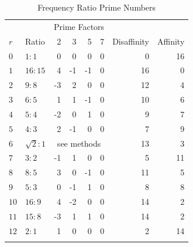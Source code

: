 \documentclass[sn-mathphys]{sn-jnl}%
\begin{document}
\begin{table}[h]
  \begin{center}
    \begin{minipage}{174pt}
      \caption{Frequency Ratio Prime Numbers}\label{tab1}%
      \begin{tabular}{@{}llrrrrrr@{}}
        \toprule
             &              & \multicolumn{4}{c}{Prime Factors} & & \\
        $r$  & Ratio        &  2 &  3 &  5 &  7 & Disaffinity & Affinity \\
        \midrule
        $0$  & $1:1$        &  0 &  0 &  0 &  0 & 0           & 16 \\
        $1$  & $16:15$      &  4 & -1 & -1 &  0 & 16          &  0 \\
        $2$  & $9:8$        & -3 &  2 &  0 &  0 & 12          &  4 \\
        $3$  & $6:5$        &  1 &  1 & -1 &  0 & 10          &  6 \\
        $4$  & $5:4$        & -2 &  0 &  1 &  0 &  9          &  7 \\
        $5$  & $4:3$        &  2 & -1 &  0 &  0 &  7          &  9 \\
        $6$  & $\sqrt{2}:1$ & \multicolumn{4}{c}{see methods}   & 13          &  3 \\
        $7$  & $3:2$        & -1 &  1 &  0 &  0 &  5          & 11 \\
        $8$  & $8:5$        &  3 &  0 & -1 &  0 & 11          &  5 \\
        $9$  & $5:3$        &  0 & -1 &  1 &  0 &  8          &  8 \\
        $10$ & $16:9$       &  4 & -2 &  0 &  0 & 14          &  2 \\
        $11$ & $15:8$       & -3 &  1 &  1 &  0 & 14          &  2 \\
        $12$ & $2:1$        &  1 &  0 &  0 &  0 &  2          & 14 \\
        \botrule
      \end{tabular}
    \end{minipage}
  \end{center}
\end{table}

\noindent
\end{document}
